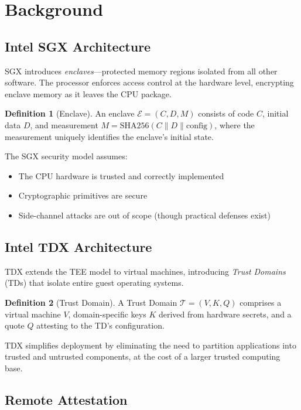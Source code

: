 \documentclass[11pt,a4paper]{article}
\theoremstyle{definition}
\newtheorem{definition}{Definition}
\begin{document}
\section{Background}

\subsection{Intel SGX Architecture}

SGX introduces \textit{enclaves}---protected memory regions isolated from all other software. The processor enforces access control at the hardware level, encrypting enclave memory as it leaves the CPU package.

\begin{definition}[Enclave]
An enclave $\mathcal{E} = (C, D, M)$ consists of code $C$, initial data $D$, and measurement $M = \text{SHA256}(C \| D \| \text{config})$, where the measurement uniquely identifies the enclave's initial state.
\end{definition}

The SGX security model assumes:
\begin{itemize}
    \item The CPU hardware is trusted and correctly implemented
    \item Cryptographic primitives are secure
    \item Side-channel attacks are out of scope (though practical defenses exist)
\end{itemize}

\subsection{Intel TDX Architecture}

TDX extends the TEE model to virtual machines, introducing \textit{Trust Domains} (TDs) that isolate entire guest operating systems.

\begin{definition}[Trust Domain]
A Trust Domain $\mathcal{T} = (V, K, Q)$ comprises a virtual machine $V$, domain-specific keys $K$ derived from hardware secrets, and a quote $Q$ attesting to the TD's configuration.
\end{definition}

TDX simplifies deployment by eliminating the need to partition applications into trusted and untrusted components, at the cost of a larger trusted computing base.

\subsection{Remote Attestation}
\end{document}
